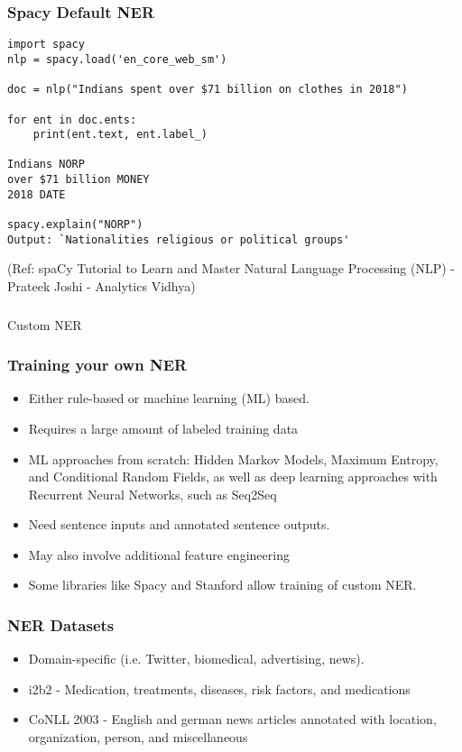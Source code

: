 \begin{frame}[fragile]\frametitle{Spacy Default NER}

\begin{lstlisting}
import spacy
nlp = spacy.load('en_core_web_sm')

doc = nlp("Indians spent over $71 billion on clothes in 2018")
 
for ent in doc.ents:
    print(ent.text, ent.label_)
		
Indians NORP
over $71 billion MONEY
2018 DATE

spacy.explain("NORP")
Output: `Nationalities religious or political groups'
\end{lstlisting}
	
	{\tiny (Ref: spaCy Tutorial to Learn and Master Natural Language Processing (NLP) - Prateek Joshi - Analytics Vidhya)}
\end{frame}

\begin{frame}[fragile]\frametitle{}

\begin{center}
{\Large Custom NER}
\end{center}
\end{frame}

\begin{frame}[fragile]\frametitle{Training your own NER}
  \begin{itemize}
  \item Either rule-based or machine learning (ML) based.
	\item Requires a large amount of labeled training data
	\item ML approaches from scratch: Hidden Markov Models, Maximum Entropy, and Conditional Random Fields, as well as deep learning approaches with Recurrent Neural Networks, such as Seq2Seq
	\item Need sentence inputs and annotated sentence outputs. 
	\item May also involve additional feature engineering
	\item Some libraries like Spacy and Stanford allow training of custom NER.
  \end{itemize}
\end{frame}


\begin{frame}[fragile]\frametitle{NER Datasets}
  \begin{itemize}
  \item Domain-specific (i.e. Twitter, biomedical, advertising, news).
	\item i2b2 - Medication, treatments, diseases, risk factors, and medications
	\item CoNLL 2003 - English and german news articles annotated with location, organization, person, and miscellaneous
  \end{itemize}
\end{frame}


